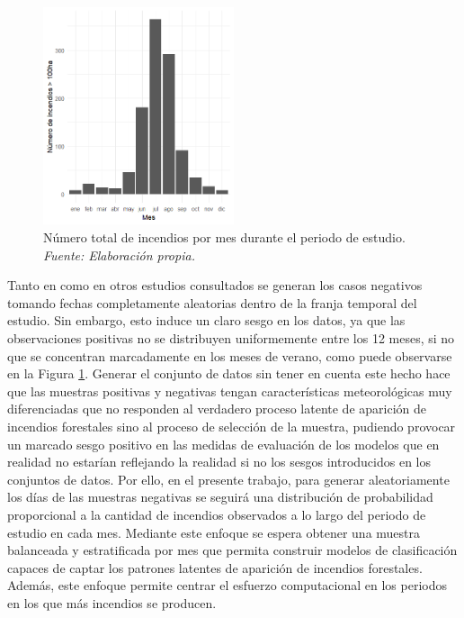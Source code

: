 \documentclass[12pt,a4paper,]{book}
\numberwithin{dummy}{section}
\theoremstyle{ocrenumbox}
\theoremstyle{blacknumex}
\theoremstyle{blacknumbox}
\theoremstyle{ocrenum}
\theoremstyle{ocrenum}
\begin{document}
\begin{figure}[htb]
\centering
\includegraphics[width=0.5\textwidth]{graficos/incendios_mes.png}
\caption[Número total de incendios por mes durante el periodo de estudio]{Número total de incendios por mes durante el periodo de estudio. \it Fuente: Elaboración propia.}
\label{fig:incendios_mes}
\end{figure}

Tanto en \citet{tojanova2006} como en otros estudios consultados se
generan los casos negativos tomando fechas completamente aleatorias
dentro de la franja temporal del estudio. Sin embargo, esto induce un
claro sesgo en los datos, ya que las observaciones positivas no se
distribuyen uniformemente entre los 12 meses, si no que se concentran
marcadamente en los meses de verano, como puede observarse en la Figura
\ref{fig:incendios_mes}. Generar el conjunto de datos sin tener en
cuenta este hecho hace que las muestras positivas y negativas tengan
características meteorológicas muy diferenciadas que no responden al
verdadero proceso latente de aparición de incendios forestales sino al
proceso de selección de la muestra, pudiendo provocar un marcado sesgo
positivo en las medidas de evaluación de los modelos que en realidad no
estarían reflejando la realidad si no los sesgos introducidos en los
conjuntos de datos. Por ello, en el presente trabajo, para generar
aleatoriamente los días de las muestras negativas se seguirá una
distribución de probabilidad proporcional a la cantidad de incendios
observados a lo largo del periodo de estudio en cada mes. Mediante este
enfoque se espera obtener una muestra balanceada y estratificada por mes
que permita construir modelos de clasificación capaces de captar los
patrones latentes de aparición de incendios forestales. Además, este
enfoque permite centrar el esfuerzo computacional en los periodos en los
que más incendios se producen.
\end{document}
